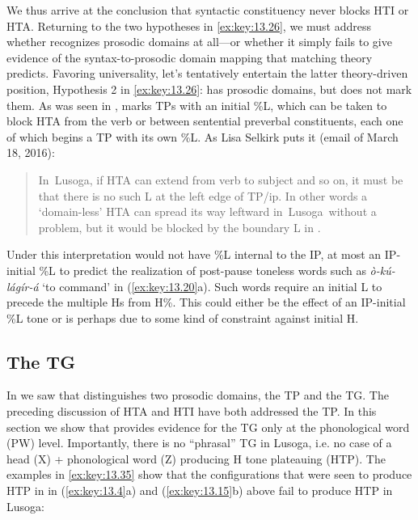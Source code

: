 \documentclass[output=paper]{langsci/langscibook}
\begin{document}
We thus arrive at the conclusion that syntactic constituency never blocks \gls{HTI}
or \gls{HTA}. Returning to the two hypotheses in \eqref{ex:key:13.26}, we must address
whether  recognizes prosodic domains at all—or whether it simply fails to
give evidence of the syntax-to-prosodic domain mapping that
 matching theory predicts. Favoring universality, let’s
tentatively entertain the latter theory-driven position, Hypothesis 2 in
\eqref{ex:key:13.26}:  has prosodic domains, but does not mark them. As was
seen in ,  marks TPs with an initial \%L, which can
be taken to block \gls{HTA} from the verb or between sentential preverbal
constituents, each one of which begins a TP with its own \%L. As Lisa Selkirk
puts it (email of March 18, 2016):

\begin{quotation}

In~Lusoga, if \gls{HTA} can extend from verb to subject and so on, it must be
that there is no such L at the left edge of TP/ip. In other words a
‘domain-less’ \gls{HTA} can spread its way leftward in~Lusoga~without a
problem, but it would be blocked by the boundary L in .

\end{quotation}
Under this interpretation  would not have \%L internal to the \gls{IP},
at most an \gls{IP}-initial \%L to predict the realization of post-pause
toneless words such as \emph{ò-kú-lágír-á} ‘to command’ in (\ref{ex:key:13.20}a).
Such words require an initial L to precede the multiple Hs from H\%. This could
either be the effect of an IP-initial \%L tone or is perhaps due to some kind
of constraint against initial H.

\subsection{The TG}\label{sub:13.3.3}

In  we saw that  distinguishes two prosodic domains, the
\gls{TP} and the \gls{TG}. The preceding discussion of \gls{HTA} and \gls{HTI}
have both addressed the TP. In this section we show that  provides
evidence for the \gls{TG} only at the phonological word (\gls{PW})
level. Importantly, there is no “phrasal” \gls{TG} in Lusoga, i.e. no case of a
head (X) + phonological word (Z) producing H tone plateauing (\gls{HTP}). The
examples in \eqref{ex:key:13.35} show that the configurations that were seen to
produce \gls{HTP} in  in (\ref{ex:key:13.4}a) and (\ref{ex:key:13.15}b)
above fail to produce \gls{HTP} in Lusoga:
\end{document}
